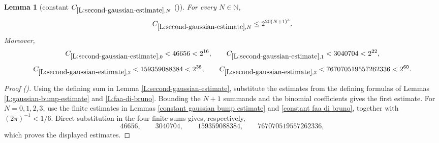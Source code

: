 \documentclass[12pt,reqno]{amsart}
\newcommand{\auto}{{({\tiny\faCar})}}
\theoremstyle{plain}
\newtheorem{lemma}[theorem]{Lemma}
\numberwithin{equation}{section}
\theoremstyle{remark}
\newcommand{\uses}[1]{}
\newcommand{\usesdefs}[1]{}
\newcommand{\N}{{\mathbb N}}
\newcommand{\ls}[1]{{\color{red}{[L: #1]}}}
\newcommand{\ct}[1]{{\color{magenta}{[C: #1]}}}
\newcommand{\jr}[1]{{\color{orange}{[J: #1]}}}
\begin{document}
\begin{lemma}[constant $C_{\ref{L:second-gaussian-estimate},N}$ \auto]\label{constant second gaussian estimate}\uses{L:gaussian-bump-estimate,L:faa-di-bruno,constant gaussian bump estimate,constant faa di bruno,L:second-gaussian-estimate}\usesdefs{}
For every $N\in\N$,
\begin{equation}\label{constant second gaussian estimate bound}
C_{\ref{L:second-gaussian-estimate},N}\le2^{20(N+1)^3}.
\end{equation}
Moreover,
\begin{equation}\label{auto:constant-second-gaussian-estimate-small}
C_{\ref{L:second-gaussian-estimate},0}<46656<2^{16},
\qquad
C_{\ref{L:second-gaussian-estimate},1}<3040704<2^{22},
\end{equation}
\begin{equation}\label{auto:constant-second-gaussian-estimate-small-high}
C_{\ref{L:second-gaussian-estimate},2}<159359088384<2^{38},
\qquad
C_{\ref{L:second-gaussian-estimate},3}<767070519557262336<2^{60}.
\end{equation}
\end{lemma}
\begin{proof}[Proof \auto]
Using the defining sum in Lemma \ref{L:second-gaussian-estimate}, substitute the estimates from the defining formulas of Lemmas \ref{L:gaussian-bump-estimate} and \ref{L:faa-di-bruno}. Bounding the $N+1$ summands and the binomial coefficients gives the first estimate. For $N=0,1,2,3$, use the finite estimates in Lemmas \ref{constant gaussian bump estimate} and \ref{constant faa di bruno}, together with $(2\pi)^{-1}<1/6$. Direct substitution in the four finite sums gives, respectively,
\[
46656,\qquad 3040704,\qquad 159359088384,\qquad 767070519557262336,
\]
which proves the displayed estimates.
\end{proof}


\jr{Need this also for other than the standard bump function $\Phi$ (in reduction section)}
\ls{I changed the assumptions on $\Phi$ (now called $\phi$ since it is no longer the standard bump) to just reflect what is needed. It seems that in applications, $\phi$ is either the standard bump or a window.}
\ct{or maybe neither, as the stadnard bump definition may change
and likewise the window.}
\end{document}
